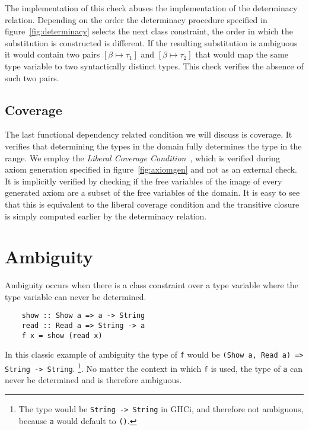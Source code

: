 The implementation of this check abuses the implementation of the determinacy
relation. Depending on the order the determinacy procedure specified in
figure~\ref{fig:determinacy} selects the next class constraint, the order in
which the substitution is constructed is different. If the resulting
substitution is ambiguous it would contain two pairs $[\beta \mapsto \tau_1]$
and $[\beta \mapsto \tau_2]$ that would map the same type variable to two
syntactically distinct types. This check verifies the absence of such two pairs.


\subsection{Coverage}
\label{sec:coverage}

The last functional dependency related condition we will discuss is coverage.
It verifies that determining the types in the domain fully determines the type
in the range. We employ the \textit{Liberal Coverage Condition}~\cite[Def.~15]{fundeps-chrs}, which is verified during axiom generation specified in
figure~\ref{fig:axiomgen} and not as an external check. It is implicitly
verified by checking if the free variables of the image of every generated axiom are
a subset of the free variables of the domain. It is easy to see that this is
equivalent to the liberal coverage condition and the transitive closure
is simply computed earlier by the determinacy relation.



\section{Ambiguity}

Ambiguity occurs when there is a class constraint over a type variable where the
type variable can never be determined.

\begin{verbatim}
    show :: Show a => a -> String
    read :: Read a => String -> a
    f x = show (read x)
\end{verbatim}

In this classic example of ambiguity the type of \texttt{f} would be
\texttt{(Show a, Read a) => String -> String}. \footnote{The type would be
\texttt{String -> String} in GHCi, and therefore not ambiguous, because
\texttt{a} would default to \texttt{()}.}. No matter the context in which
\texttt{f} is used, the type of \texttt{a} can never be determined and is
therefore ambiguous.

